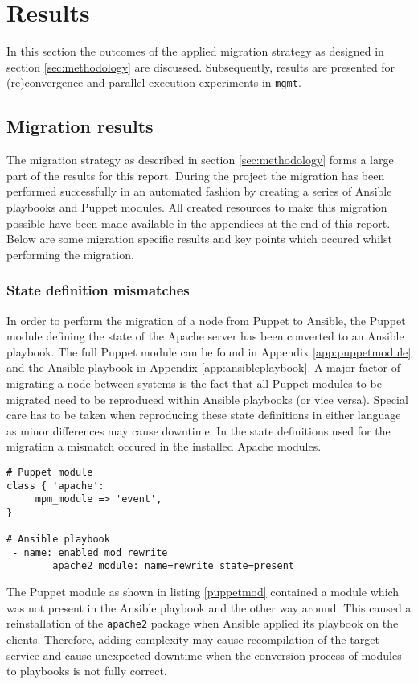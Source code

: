 \section{Results}\label{sec:results}
In this section the outcomes of the applied migration strategy as designed in section \ref{sec:methodology} are discussed. Subsequently, results are presented for (re)convergence and parallel execution experiments in \texttt{mgmt}.

\subsection{Migration results}
The migration strategy as described in section \ref{sec:methodology} forms a large part of the results for this report. During the project the migration has been performed successfully in an automated fashion by creating a series of Ansible playbooks and Puppet modules. All created resources to make this migration possible have been made available in the appendices at the end of this report. Below are some migration specific results and key points which occured whilst performing the migration. 

\subsubsection{State definition mismatches}
In order to perform the migration of a node from Puppet to Ansible, the Puppet module defining the state of the Apache server has been converted to an Ansible playbook. The full Puppet module can be found in Appendix \ref{app:puppetmodule} and the Ansible playbook in Appendix \ref{app:ansibleplaybook}. A major factor of migrating a node between systems is the fact that all Puppet modules to be migrated need to be reproduced within Ansible playbooks (or vice versa). Special care has to be taken when reproducing these state definitions in either language as minor differences may cause downtime. In the state definitions used for the migration a mismatch occured in the installed Apache modules.
\\
\begin{lstlisting}[caption={Module mismatch in state definitions},label=puppetmod]
# Puppet module
class { 'apache':
     mpm_module => 'event',
}

# Ansible playbook
 - name: enabled mod_rewrite
        apache2_module: name=rewrite state=present
\end{lstlisting}

\noindent
The Puppet module as shown in listing \ref{puppetmod} contained a module which was not present in the Ansible playbook and the other way around. This caused a reinstallation of the \texttt{apache2} package when Ansible applied its playbook on the clients. Therefore, adding complexity may cause recompilation of the target service and cause unexpected downtime when the conversion process of modules to playbooks is not fully correct.


